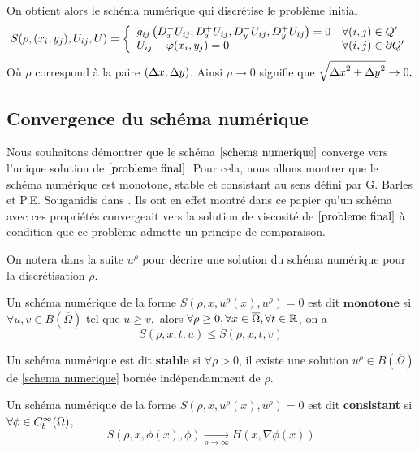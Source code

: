 On obtient alors le schéma numérique qui discrétise le problème initial 
\begin{align}\label{schema numerique}
    S(\rho,(x_i,y_j),U_{ij},U) = \left\{
    \begin{array}{ll}
         g_{ij}\left(D_x^-U_{ij},D_x^+U_{ij},D_y^-U_{ij},D_y^+U_{ij}\right) = 0 & \forall(i,j)\in Q'\\
         U_{ij} - \varphi(x_i,y_j)= 0 & \forall(i,j)\in \mathop{}\!{\partial} Q'
    \end{array}
    \right.
\end{align}
Où $\rho$ correspond à la paire $\left(\Delta x,\Delta y\right)$. Ainsi $\rho \rightarrow 0$ signifie que $\sqrt{{\Delta x}^2+{\Delta y}^2} \rightarrow 0.$
\subsection{Convergence du schéma numérique}

Nous souhaitons démontrer que le schéma $\eqref{schema numerique}$ converge vers l'unique solution de $\eqref{probleme final}$. Pour cela, nous allons montrer que le schéma numérique est monotone, stable et consistant au sens défini par G. Barles et P.E. Souganidis dans \cite{Barles_et_Souganidis}. Ils ont en effet montré dans ce papier qu'un schéma avec ces propriétés convergeait vers la solution de viscosité de $\eqref{probleme final}$ à condition que ce problème admette un principe de comparaison.

On notera dans la suite $u^{\rho}$ pour décrire une solution du schéma numérique pour la discrétisation $\rho$.

\begin{definition}
    Un schéma numérique de la forme $S(\rho,x,u^{\rho}(x),u^{\rho})=0$ est dit $\textbf{monotone}$ si
    $ \forall u,v \in B(\overline{\Omega})$ tel que $u\geq v,$ alors
    $ \forall \rho \geq 0, \forall x\in \overline{\Omega}, \forall t \in \mathbb{R}$, on a 
    \begin{equation*}
        S(\rho,x,t,u)\leq S(\rho,x,t,v)
    \end{equation*}
    
\end{definition}
\begin{definition}
     Un schéma numérique est dit $\textbf{stable}$ si $\forall \rho > 0$, il existe une solution $u^{\rho}\in B(\overline{\Omega})$ de \eqref{schema numerique} bornée indépendamment de $\rho$.
\end{definition}

\begin{definition}
    Un schéma numérique de la forme $S(\rho,x,u^{\rho}(x),u^{\rho})=0$ est dit \textbf{consistant} si
    $\forall \phi \in C^{\infty}_b(\overline{\Omega})$,
    \begin{equation*}
        S\left(\rho,x,\phi(x),\phi\right) \underset{\rho \rightarrow \infty}{\longrightarrow} H\left(x,\nabla \phi(x)\right)
    \end{equation*}
\end{definition}

